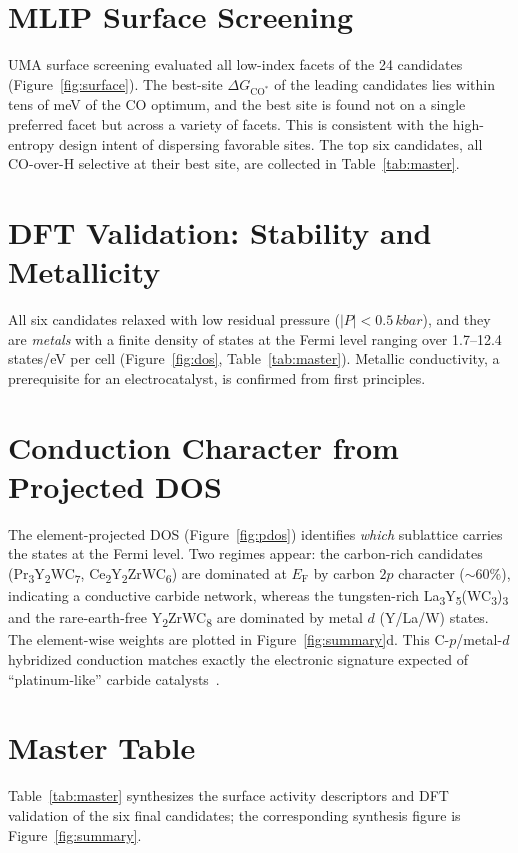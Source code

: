 \documentclass[11pt,a4paper]{report}
\providecommand{\SI}[2]{#1\,#2}
\providecommand{\SIrange}[3]{#1--#2\,#3}
\newcommand{\dGCO}{\Delta G_{\mathrm{CO^*}}}
\newcommand{\Ef}{E_\mathrm{F}}
\begin{document}
\section{MLIP Surface Screening}
UMA surface screening evaluated all low-index facets of the 24 candidates (Figure~\ref{fig:surface}). The best-site $\dGCO$ of the leading
candidates lies within tens of meV of the CO optimum, and the best site is found not on a single preferred facet but across a variety of
facets. This is consistent with the high-entropy design intent of dispersing favorable sites. The top six candidates, all
CO-over-H selective at their best site, are collected in Table~\ref{tab:master}.

\section{DFT Validation: Stability and Metallicity}
All six candidates relaxed with low residual pressure ($|P|<\SI{0.5}{kbar}$), and they are \emph{metals} with a finite density of states at
the Fermi level ranging over \SIrange{1.7}{12.4}{states/eV} per cell (Figure~\ref{fig:dos},
Table~\ref{tab:master}). Metallic conductivity, a prerequisite for an electrocatalyst, is confirmed from first principles.

\section{Conduction Character from Projected DOS}
The element-projected DOS (Figure~\ref{fig:pdos}) identifies \emph{which} sublattice carries the states at the Fermi level.
Two regimes appear: the carbon-rich candidates (Pr\textsubscript{3}Y\textsubscript{2}WC\textsubscript{7},
Ce\textsubscript{2}Y\textsubscript{2}ZrWC\textsubscript{6}) are dominated at $\Ef$ by carbon $2p$ character
($\sim$60\%), indicating a conductive carbide network, whereas the tungsten-rich
La\textsubscript{3}Y\textsubscript{5}(WC\textsubscript{3})\textsubscript{3} and the rare-earth-free
Y\textsubscript{2}ZrWC\textsubscript{8} are dominated by metal $d$ (Y/La/W) states. The element-wise weights are
plotted in Figure~\ref{fig:summary}d. This C-$p$/metal-$d$ hybridized conduction matches exactly the electronic signature expected of
``platinum-like'' carbide catalysts~\cite{levy1973}.

\section{Master Table}
Table~\ref{tab:master} synthesizes the surface activity descriptors and DFT validation of the six final candidates; the corresponding
synthesis figure is Figure~\ref{fig:summary}.
\end{document}
